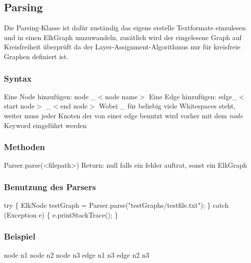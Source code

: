



\subsection*{Parsing}
Die Parsing-Klasse ist dafür zuständig das eigens erstelle Textformate einzulesen
und in einen ElkGraph umzuwandeln, zusätlich wird der eingelesene Graph auf Kreisfreiheit überprüft
da der Layer-Assignment-Algorithmus nur für kreisfreie Graphen definiert ist.

\subsubsection*{Syntax}
Eine Node hinzufügen:
\newline
\tab[0.5cm]  node \_$<$node name$>$
\newline
\newline
Eine Edge hinzufügen:\newline
\tab[0.5cm]  edge\_$<$start node$>$ \_$<$end node$>$
\newline
Wobei \_ für beliebig viele Whitespaces steht,
weiter muss jeder Knoten der von einer edge benutzt wird vorher mit dem \textit{node} Keyword eingeführt werden

\subsubsection*{Methoden}
Parser.parse(<filepath>)\newline
Return: null falls ein fehler auftrat, sonst ein ElkGraph

\subsubsection*{Benutzung des Parsers}
try 
\{\newline
ElkNode testGraph = Parser.parse("testGraphs/testfile.txt");
\newline
\}
\newline
catch (Exception e)
\newline
\{
\newline
  e.printStackTrace(); 
\newline
\}


\subsubsection*{Beispiel}
node n1 \newline
node n2 \newline
node n3 \newline
\newline
\newline
edge n1 n3\newline 
edge n2 n3 \newline









